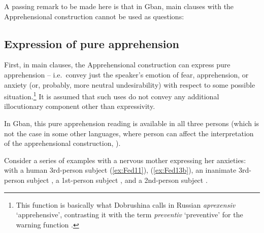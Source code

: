 \documentclass[output=paper,colorlinks,citecolor=brown
]{langscibook}
\begin{document}
A passing remark to be made here is that in Gban, main clauses with the Apprehensional construction cannot be used as questions:

\z

\subsection{Expression of pure apprehension}
\label{subsec:expression}

First, in main clauses, the Apprehensional construction can express pure apprehension -- i.e.\ convey just the speaker's emotion of fear, apprehension, or anxiety (or, probably, more neutral undesirability) with respect to some possible situation.\footnote{This function is basically what Dobrushina calls in Russian \textit{aprexensiv} `apprehensive', contrasting it with the term \textit{preventiv} `preventive' for the warning function \citep{Dobrushina2006}.} It is assumed that such uses do not convey any additional illocutionary component other than expressivity.

In Gban, this pure apprehension reading is available in all three persons (which is not the case in some other languages, where person can affect the interpretation of the apprehensional construction, \citealt{chapters/vuillermet}).

Consider a series of examples with a nervous mother expressing her anxieties: with a human 3rd-person subject (\ref{ex:Fed11}), (\ref{ex:Fed13b}), an inanimate 3rd-person subject , a 1st-person subject , and a 2nd-person subject .


\z
\end{document}
